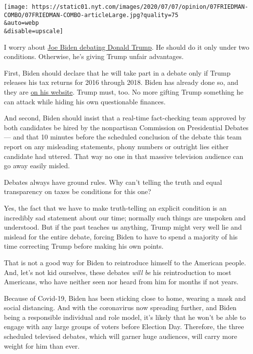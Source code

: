 \texttt{[image: https://static01.nyt.com/images/2020/07/07/opinion/07FRIEDMAN-COMBO/07FRIEDMAN-COMBO-articleLarge.jpg?quality=75\\\&auto=webp\\\&disable=upscale]}

I worry about
\href{https://www.nytimes.com/2020/08/06/us/politics/presidential-debates-trump-biden.html}{Joe
Biden debating Donald Trump}. He should do it only under two conditions.
Otherwise, he's giving Trump unfair advantages.

First, Biden should declare that he will take part in a debate only if
Trump releases his tax returns for 2016 through 2018. Biden has already
done so, and they are
\href{https://joebiden.com/financial-disclosure/}{on his website}. Trump
must, too. No more gifting Trump something he can attack while hiding
his own questionable finances.

And second, Biden should insist that a real-time fact-checking team
approved by both candidates be hired by the nonpartisan Commission on
Presidential Debates --- and that 10 minutes before the scheduled
conclusion of the debate this team report on any misleading statements,
phony numbers or outright lies either candidate had uttered. That way no
one in that massive television audience can go away easily misled.

Debates always have ground rules. Why can't telling the truth and equal
transparency on taxes be conditions for this one?

Yes, the fact that we have to make truth-telling an explicit condition
is an incredibly sad statement about our time; normally such things are
unspoken and understood. But if the past teaches us anything, Trump
might very well lie and mislead for the entire debate, forcing Biden to
have to spend a majority of his time correcting Trump before making his
own points.

That is not a good way for Biden to reintroduce himself to the American
people. And, let's not kid ourselves, these debates \emph{will}
\emph{be} his reintroduction to most Americans, who have neither seen
nor heard from him for months if not years.

Because of Covid-19, Biden has been sticking close to home, wearing a
mask and social distancing. And with the coronavirus now spreading
further, and Biden being a responsible individual and role model, it's
likely that he won't be able to engage with any large groups of voters
before Election Day. Therefore, the three scheduled televised debates,
which will garner huge audiences, will carry more weight for him than
ever.

